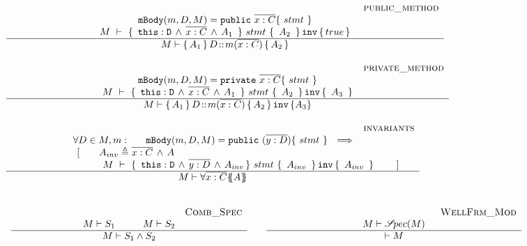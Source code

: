 {$
\begin{array}{l}
\inferruleSD 
{~ \strut \hspace{6.5cm} {\sc{public\_method}}}
{  
 \prg{mBody}(m,D,M)=\prg{public} \ \overline{x:C}\{\  stmt \ \}      
    \\
  {\hprovesN{M} { \ \prg{this}:\prg{D}\, \wedge\, \overline{x:C}\, \wedge\, A_1\  } {\ stmt\ } {\ A_2 \ }   {true} } 
}
{
M \vdash {\mprepost {A_1}{D}{m}{x}{C}{A_2} }
}
\\ \\
\inferruleSD 
{~ \strut \hspace{6.5cm} {\sc{private\_method}}}
{  
  \prg{mBody}(m,D,M)=\prg{private} \ \overline{x:C}\{\  stmt \ \}      
    \\
  {\hprovesN{M} { \ \prg{this}:\prg{D}\, \wedge\, \overline{x:C}\, \wedge\, A_1\  } {\ stmt\ } {\ A_2 \ }   {\ A_3\ } } 
}
{
M \vdash {\mprepostN {A_1}{D}{m}{x}{C}{A_2} {A_3} }
}
\\
\\
\inferruleSD 
{~ \strut \hspace{6.5cm} {\sc{invariants}}}
{  
\forall  D\in M,  m:\ \ \  \ \  \prg{mBody}(m,D,M)=\prg{public} \ (\overline{y:D})\{\  stmt \ \}      \ \ \Longrightarrow  
    \\
    \begin{array}{l}
   ~ \strut \hspace{1.7cm}[ \ \ \ \  \ \ A_{inv} \triangleq \overline{x:C}\, \wedge\, A
  \\
  ~ \strut \hspace{1.7cm} \ \ \ \ \  \ \ \  {\hprovesN{M} { \ \prg{this}:\prg{D}\, \wedge\, \overline{y:D}\, \wedge\,  A_{inv} } {\ stmt\ } {\ A_{inv}\ } {\ A_{inv} \ }  } \ \ \ \ \  \ \ ]
\end{array}
}
{
M \vdash \TwoStatesN{ \overline{x:C}} {A}
}
\\
\\
\\
\begin{array}{lcl}
\inferruleSD 
{~ \strut   {\sc{Comb\_Spec}}}
{  
M \vdash S_1 \hspace{1cm}  M \vdash S_2
}
{
M \vdash S_1 \wedge S_2
}
& &
\inferruleSD 
{~ \strut  {\sc{WellFrm\_Mod}}}
{  M \vdash \SpecOf {M}
}
{
\vdash M  
}
\end{array}
\end{array}
$
 
}
